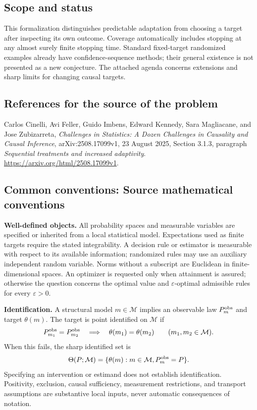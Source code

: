\documentclass[11pt,a4paper]{article}
\begin{document}
\subsection*{Scope and status}
This formalization distinguishes predictable adaptation from choosing a target after inspecting its own outcome. Coverage automatically includes stopping at any almost surely finite stopping time. Standard fixed-target randomized examples already have confidence-sequence methods; their general existence is not presented as a new conjecture. The attached agenda concerns extensions and sharp limits for changing causal targets.
\subsection*{References for the source of the problem}
Carlos Cinelli, Avi Feller, Guido Imbens, Edward Kennedy, Sara Magliacane, and Jose Zubizarreta, \emph{Challenges in Statistics: A Dozen Challenges in Causality and Causal Inference}, arXiv:2508.17099v1, 23 August 2025, Section 3.1.3, paragraph \emph{Sequential treatments and increased adaptivity}. \url{https://arxiv.org/html/2508.17099v1}.

\subsection*{Common conventions: Source mathematical conventions}

\textbf{Well-defined objects.}
All probability spaces and measurable variables are specified or inherited
from a local statistical model. Expectations used as finite targets require
the stated integrability. A decision rule or estimator is measurable with
respect to its available information; randomized rules may use an auxiliary
independent random variable. Norms without a subscript are Euclidean in
finite-dimensional spaces. An optimizer is requested only when attainment
is assured; otherwise the question concerns the optimal value and
$\varepsilon$-optimal admissible rules for every $\varepsilon>0$.

\textbf{Identification.}
A structural model $m\in\mathcal M$ implies an observable law
$P_m^{\rm obs}$ and target $\theta(m)$. The target is point identified on
$\mathcal M$ if
\[
 P_{m_1}^{\rm obs}=P_{m_2}^{\rm obs}
 \quad\Longrightarrow\quad\theta(m_1)=\theta(m_2)
 \qquad(m_1,m_2\in\mathcal M).
\]
When this fails, the sharp identified set is
\[
 \Theta(P;\mathcal M)=\{\theta(m):m\in\mathcal M,
                                  P_m^{\rm obs}=P\}.
\]
Specifying an intervention or estimand does not establish identification.
Positivity, exclusion, causal sufficiency, measurement restrictions, and
transport assumptions are substantive local inputs, never automatic
consequences of notation.
\end{document}
